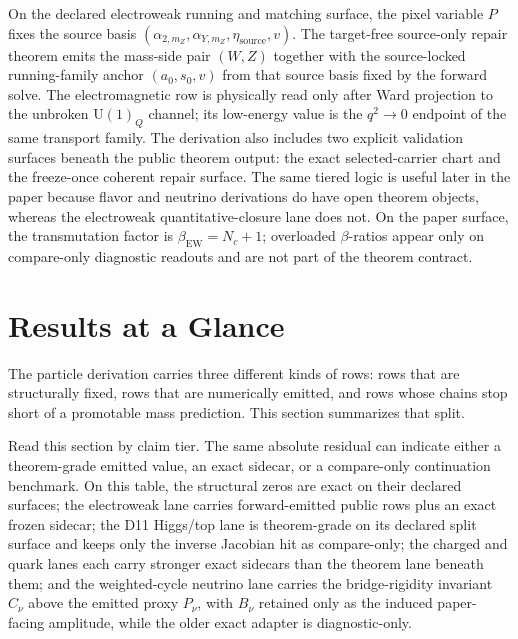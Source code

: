 \documentclass[11pt]{article}
\newcommand{\U}{\mathrm{U}}
\begin{document}
On the declared electroweak running and matching surface, the pixel variable \(P\) fixes the
source basis
\((\alpha_{2,m_Z},\alpha_{Y,m_Z},\eta_{\mathrm{source}},v)\). The target-free
source-only repair theorem emits the mass-side pair \((W,Z)\) together with the source-locked
running-family anchor \((a_0,s_0,v)\) from that source basis fixed by the forward solve. The
electromagnetic row is physically read only after Ward projection to the unbroken \(\U(1)_Q\)
channel; its low-energy value is the \(q^2\to0\) endpoint of the same transport family. The
derivation also includes two explicit validation surfaces beneath the public theorem output: the
exact selected-carrier chart and the freeze-once coherent repair surface. The same tiered logic is
useful later in the paper because flavor and neutrino derivations do have open theorem objects,
whereas the electroweak quantitative-closure lane does not.
On the paper surface, the transmutation factor is \(\beta_{\mathrm{EW}}=N_c+1\); overloaded \(\beta\)-ratios appear only on compare-only diagnostic readouts and are not part of the theorem contract.

\section{Results at a Glance}

The particle derivation carries three different kinds of rows: rows that are
structurally fixed, rows that are numerically emitted, and rows whose chains stop short of a promotable mass prediction. This section summarizes that split.

Read this section by claim tier. The same absolute residual can indicate either a theorem-grade emitted value, an exact sidecar, or a compare-only continuation benchmark. On this table, the structural zeros are exact on their declared surfaces; the electroweak lane carries forward-emitted public rows plus an exact frozen sidecar; the D11 Higgs/top lane is theorem-grade on its declared split surface and keeps only the inverse Jacobian hit as compare-only; the charged and quark lanes each carry stronger exact sidecars than the theorem lane beneath them; and the weighted-cycle neutrino lane carries the bridge-rigidity invariant \(C_\nu\) above the emitted proxy \(P_\nu\), with \(B_\nu\) retained only as the induced paper-facing amplitude, while the older exact adapter is diagnostic-only.
\end{document}
